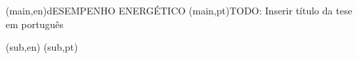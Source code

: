 
%




%
%
%
%
\nttitle(main,en){dESEMPENHO ENERGÉTICO}%
\nttitle(main,pt){TODO: Inserir título da tese em português}%

\nttitle(sub,en){}%
\nttitle(sub,pt){}%



%
%
%
%



